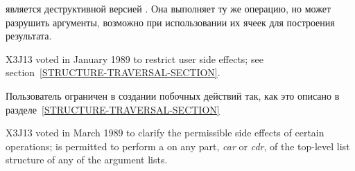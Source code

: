 \begin{defun}[Функция]
 является деструктивной версией .
Она выполняет ту же операцию, но может разрушить аргументы, возможно при
использовании их ячеек для построения результата.

\begin{new}
X3J13 voted in January 1989
to restrict user side effects; see section~\ref{STRUCTURE-TRAVERSAL-SECTION}.
\end{new}

Пользователь ограничен в создании побочных действий так, как это описано в
разделе~\ref{STRUCTURE-TRAVERSAL-SECTION}

\begin{newer}
X3J13 voted in March 1989 
to clarify the permissible side effects of certain operations;
 is permitted to perform a  on any part,
\emph{car} or \emph{cdr}, of the top-level list structure of 
any of the argument lists.
\end{newer}
\end{defun}

